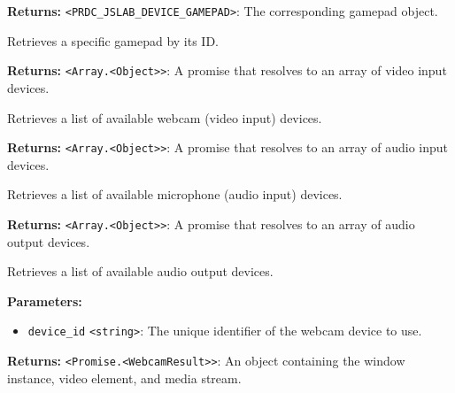 \documentclass[12pt,a4paper]{article}
\begin{document}
\noindent \textbf{Returns:} \texttt{<PRDC\_JSLAB\_DEVICE\_GAMEPAD>}: The corresponding gamepad object.

\noindent Retrieves a specific gamepad by its ID.

\vspace{5mm}
\noindent {}


\noindent \textbf{Returns:} \texttt{<Array.<Object>>}: A promise that resolves to an array of video input devices.

\noindent Retrieves a list of available webcam (video input) devices.

\vspace{5mm}
\noindent {}


\noindent \textbf{Returns:} \texttt{<Array.<Object>>}: A promise that resolves to an array of audio input devices.

\noindent Retrieves a list of available microphone (audio input) devices.

\vspace{5mm}
\noindent {}


\noindent \textbf{Returns:} \texttt{<Array.<Object>>}: A promise that resolves to an array of audio output devices.

\noindent Retrieves a list of available audio output devices.

\vspace{5mm}
\noindent {}


\noindent \textbf{Parameters:}
\begin{itemize}
  \item \texttt{device\_id} \texttt{<string>}: The unique identifier of the webcam device to use.
\end{itemize}

\noindent \textbf{Returns:} \texttt{<Promise.<WebcamResult>>}: An object containing the window instance, video element, and media stream.
\end{document}
